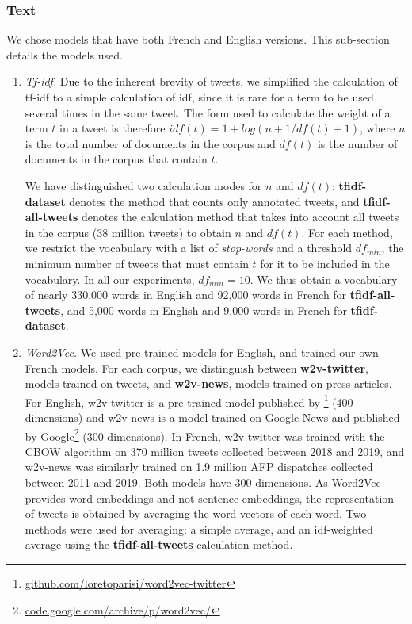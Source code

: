 \subsubsection{Text}
\label{Subsubsec: text}
We chose models that have both French and English versions. This sub-section details the models used.

\begin{enumerate}
    \item \textit{Tf-idf.} Due to the inherent brevity of tweets, we simplified the calculation of tf-idf to a simple calculation of idf, since it is rare for a term to be used several times in the same tweet. The form used to calculate the weight of a term $t$ in a tweet is therefore $idf(t) = 1 + log(n+1/df(t)+1)$, where $n$ is the total number of documents in the corpus and $df(t)$ is the number of documents in the corpus that contain $t$.
    
We have distinguished two calculation modes for $n$ and $df(t)$: \textbf{tfidf-dataset} denotes the method that counts only annotated tweets, and \textbf{tfidf-all-tweets} denotes the calculation method that takes into account all tweets in the corpus (38 million tweets) to obtain $n$ and $df(t)$. For each method, we restrict the vocabulary with a list of \textit{stop-words} and a threshold $df_{min}$, the minimum number of tweets that must contain $t$ for it to be included in the vocabulary. In all our experiments, $df_{min}=10$. We thus obtain a vocabulary of nearly 330,000 words in English and 92,000 words in French for \textbf{tfidf-all-tweets}, and 5,000 words in English and 9,000 words in French for \textbf{tfidf-dataset}.

\item \textit{Word2Vec.} We used pre-trained models for English, and trained our own French models. For each corpus, we distinguish between \textbf{w2v-twitter}, models trained on tweets, and \textbf{w2v-news}, models trained on press articles. For English, w2v-twitter is a pre-trained model published by \citet{godin2015multimedia}\footnote{\url{github.com/loretoparisi/word2vec-twitter}} (400 dimensions) and w2v-news is a model trained on Google News and published by Google\footnote{\url{code.google.com/archive/p/word2vec/}}  (300 dimensions). In French, w2v-twitter was trained with the CBOW algorithm on 370 million tweets collected between 2018 and 2019, and w2v-news was similarly trained on 1.9 million AFP dispatches collected between 2011 and 2019. Both models have 300 dimensions.
As Word2Vec provides word embeddings and not sentence embeddings, the representation of tweets is obtained by averaging the word vectors of each word. Two methods were used for averaging: a simple average, and an idf-weighted average using the \textbf{tfidf-all-tweets} calculation method.


\end{enumerate}
